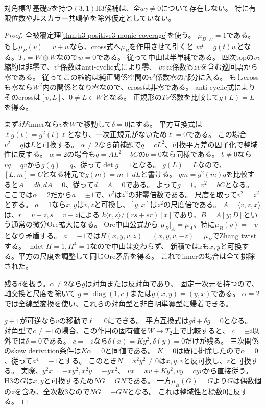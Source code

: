 \begin{theorem}\label{thm:h3-positive3-diagonal-base-exclusion}
対角標準基礎$S$を持つ$(3,1)$H3候補は、全$a\gamma\ne0$について存在しない。
特に有限位数や非スカラー共鳴値を除外仮定としていない。
\end{theorem}
\begin{proof}
全被覆定理\ref{thm:h3-positive3-monic-coverage}を使う。
$\mu_B|_W=1$である。もし$\mu_B(v)=v+w$なら、cross式へ$\mu_B$を作用させて引くと
$wt=g(t)w$となる。$T_2=W\otimes W$なので$w=0$である。
従って中山は半単純である。
四次topの$vv$縮約は非零で、$v^4$係数はanti-cyclic式により零、
$vvzz$係数も$zv$を含む巡回語から零である。
従ってこの縮約は純正関係空間の$v^2$係数零の部分に入る。
もしcrossも零なら$W^2$内の関係となり零なので、crossは非零である。
anti-cyclic式によりそのcrossは$[v,L]$、$0\ne L\in W$となる。
正規形の$Tv$係数を比較して$g(L)=L$を得る。

まず$\delta$がinnerなら$v$を$W$で移動して$\delta=0$にする。
平方互換式は$\ell g(t)=g^2(t)\ell$となり、一次正規元がないため$\ell=0$である。
この場合$v^2=q$は$L$と可換する。
$\alpha\ne2$なら前補題で$q=cL^2$、可換平方差の因子化で整域性に反する。
$\alpha=2$の場合も$q=A L^2+bC$の$b=0$なら同様である。
$b\ne0$なら$vq=qv$から$g(q)=q$、従って$\det g=1$となる。
$g(L)=L$なので、$[L,m]=C$となる補元で$g(m)=m+dL$と書ける。
$q m=g^2(m)q$を比較すると$A=db,dA=0$、従って$d=A=0$である。
よって$g=1$、$v^2=bC$となる。
ここでは$\alpha=2$だから$a=\pm1$で、$v^2$は$z^2$の非零倍数である。
尺度を取って$v^2=z^2$とする。
$a=1$なら$x,y$は$v,z$と可換し、$[y,x]$は$z^2$の尺度倍である。
$A=\langle v,z,x\rangle$は、$r=v+z,s=v-z$による
$k\langle r,s\rangle/(rs+sr)[x]$であり、$B=A[y;D]$という通常の微分Ore拡大になる。
Ore中山公式\cite[Theorem 3.3]{LWWOre}から
$\mu_B|_A=\mu_A$、特に$\mu_B(v)=-v$となり矛盾する。
$a=-1$では$H(x,y,v,z)=(x,y,v,-z)=\mu_B$でZhang twistする。
$\operatorname{hdet}H=1,H^4=1$なので中山は変わらず、
新積では$z$も$x,y$と可換する。平方の尺度を調整して同じOre矛盾を得る。
これでinnerの場合は全て排除された。

残る$\delta$を扱う。$\alpha\ne2$なら$g$は対角または反対角であり、
固定一次元を持つので、軸交換と尺度を除いて
$g=\operatorname{diag}(1,c)$または$g(x,y)=(y,x)$である。
$\alpha=2$では全線型変換を使い、これらの対角型と非自明単冪型に帰着できる。

$g+1$が可逆なら$v$の移動で$\ell=0$にできる。
平方互換式は$g\delta+\delta g=0$となる。
対角型で$c\ne-1$の場合、この作用の固有値を$W\to T_2$上で比較すると、
$c=\pm i$以外では$\delta=0$である。
$c=\pm i$なら$\delta(x)=K y^2,\delta(y)=0$だけが残る。
三次関係のskew derivation条件は$K\alpha=0$と同値である。
$K=0$は既に排除したので$\alpha=0$、従って$a^4=-1$とする。
このとき$N=x^2y^2\ne0$は$x,y,v$と反可換し、$z$と可換する。
実際、$y^2x=-xy^2,x^2y=-yx^2$、
$vx=xv+Ky^2,vy=cyv$から直接従う。
H3の$G$は$x,y$と可換するため$NG=GN$である。
一方$\mu_B(G)=G$より$G$は偶数個の$z$を含み、全次数3なので$NG=-GN$となる。
これは整域性と標数0に反する。


\end{proof}
